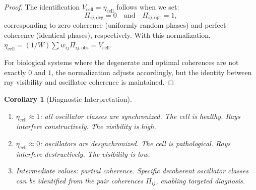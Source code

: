 \documentclass[11pt,twocolumn,a4paper]{article}
\newtheorem{corollary}[theorem]{Corollary}
\newcommand{\etacell}{\eta_{\mathrm{cell}}}
\newcommand{\Vcell}{V_{\mathrm{cell}}}
\begin{document}
\begin{proof}
The identification $\Vcell = \etacell$ follows when we set:
\begin{equation}
\Pi_{ij,\mathrm{deg}} = 0 \quad \text{and} \quad
\Pi_{ij,\mathrm{opt}} = 1,
\end{equation}
corresponding to zero coherence (uniformly random phases) and perfect
coherence (identical phases), respectively. With this normalization,
$\etacell = (1/W) \sum w_{ij} \Pi_{ij,\mathrm{obs}} = \Vcell$.

For biological systems where the degenerate and optimal coherences
are not exactly $0$ and $1$, the normalization adjusts accordingly,
but the identity between ray visibility and oscillator coherence
is maintained.
\end{proof}

\begin{corollary}[Diagnostic Interpretation]
\label{cor:diagnostic}
\begin{enumerate}[label=(\roman*),leftmargin=*]
\item $\etacell \approx 1$: all oscillator classes are synchronized.
  The cell is healthy. Rays interfere constructively. The visibility
  is high.
\item $\etacell \approx 0$: oscillators are desynchronized. The cell
  is pathological. Rays interfere destructively. The visibility is
  low.
\item Intermediate values: partial coherence. Specific decoherent
  oscillator classes can be identified from the pair coherences
  $\Pi_{ij}$, enabling targeted diagnosis.
\end{enumerate}
\end{corollary}
\end{document}
